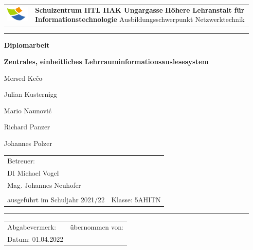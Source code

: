 \setlength{\TPHorizModule}{10mm}
\setlength{\TPVertModule}{10mm}
\textblockorigin{0cm}{0cm}

\begin{titlepage}
    \begin{tabular}{p{2.5cm}p{}}
        \vspace{0mm}
        \includegraphics[width=3cm]{media/szu_logo.png} &
        \centering
        {\Large \textbf{Schulzentrum HTL HAK Ungargasse} \vspace{5mm}} \newline
        \textbf{Höhere Lehranstalt für Informationstechnologie} \newline
        Ausbildungsschwerpunkt Netzwerktechnik 
        \end{tabular}
        \vspace{5mm}
        \hrule
    \begin{center}
    \vspace{15mm}
    \begin{huge}
        \textbf{Diplomarbeit}
        \vspace{8mm}

        \begin{onehalfspace}
            \textbf{Zentrales, einheitliches Lehrraum\-informations\-auslesesystem}
        \end{onehalfspace}
    \end{huge}
    \vspace{1cm}
    \begin{large}
        Mersed Kečo

        Julian Kusternigg
        
        Mario Naunović
        
        Richard Panzer
        
        Johannes Polzer
    \end{large}
\end{center}
\vfill
\begin{tabular}{p{}l}
    Betreuer: & \\
    
    {\large DI Michael Vogel} & \\
    {\large Mag. Johannes Neuhofer} & \\\\
    ausgeführt im Schuljahr 2021/22 & Klasse: 5AHITN \\

\end{tabular}
\vspace{1cm}
\hrule
    \begin{tabular}{p{}l}
        
        Abgabevermerk: &übernommen von:\\     
        
        Datum: 01.04.2022 & 
    \end{tabular}
\end{titlepage}